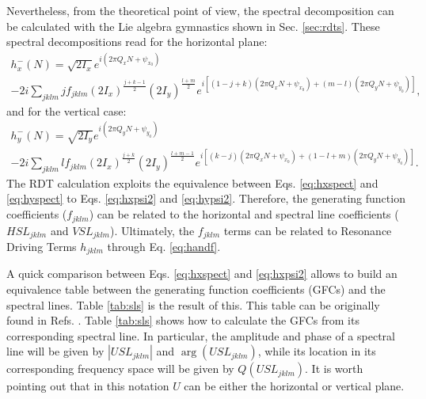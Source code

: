 Nevertheless, from the theoretical point of view, the spectral decomposition can be calculated with the Lie algebra gymnastics shown in Sec. \ref{sec:rdts}. These spectral decompositions read for the horizontal plane:
\begin{multline}
    \label{eq:hxpsi2}
    h_x^{-}(N)=\sqrt{2I_x}e^{i\left( 2 \pi Q_x N+\psi_{x_0}\right)} \\
    -2i \sum_{jklm} j f_{jklm} \left( 2I_x \right)^{\frac{j+k-1}{2}}\left( 2I_y \right)^{\frac{l+m}{2}}
    e^{i \left[ \left( 1-j+k\right)\left( 2 \pi Q_x N + \psi_{x_0} \right) +\left( m-l\right)\left( 2 \pi Q_y N + \psi_{y_0} \right)\right]},
\end{multline}
and for the vertical case:
\begin{multline}
    \label{eq:hypsi2}
    h_y^{-}(N)=\sqrt{2I_y}e^{i\left( 2 \pi Q_y N+\psi_{y_0}\right)} \\
    -2i \sum_{jklm} l f_{jklm} \left( 2I_x \right)^{\frac{j+k}{2}}\left( 2I_y \right)^{\frac{l+m-1}{2}}
    e^{i \left[ \left( k-j\right)\left( 2 \pi Q_x N + \psi_{x_0} \right) +\left( 1-l+m\right)\left( 2 \pi Q_y N + \psi_{y_0} \right)\right]}.
\end{multline}
The RDT calculation exploits the equivalence between Eqs. \ref{eq:hxspect} and \ref{eq:hyspect} to Eqs. \ref{eq:hxpsi2} and \ref{eq:hypsi2}. Therefore, the generating function coefficients ($f_{jklm}$) can be related to the horizontal and spectral line coefficients ($HSL_{jklm}$ and $VSL_{jklm}$). Ultimately, the $f_{jklm}$ terms can be related to Resonance Driving Terms $h_{jklm}$ through Eq. \ref{eq:handf}.

A quick comparison between Eqs. \ref{eq:hxspect} and \ref{eq:hxpsi2} allows to build an equivalence table between the generating function coefficients (GFCs) and the spectral lines. Table \ref{tab:sls} is the result of this. This table can be originally found in Refs. \cite{sussix,bartolini}. Table \ref{tab:sls} shows how to calculate the GFCs from its corresponding spectral line. In particular, the amplitude and phase of a spectral line will be given by $|USL_{jklm}|$ and $\arg(USL_{jklm})$, while its location in its corresponding frequency space will be given by $Q(USL_{jklm})$. It is worth pointing out that in this notation $U$ can be either the horizontal or vertical plane.


